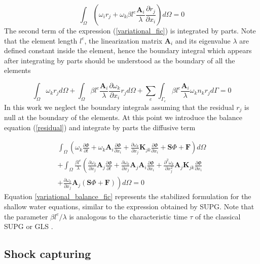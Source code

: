 \documentclass[a4paper,12pt]{article}
\newcommand{\pder}[2]{\frac{\partial#1}{\partial#2}}
\newcommand{\ppder}[2]{\frac{\partial^2#1}{\partial#2^2}}
\begin{document}
\begin{equation} \label{variational_fic}
\int_\Omega \left(
    \omega_i r_j + \omega_k \beta l^e\frac{\mathbf{A}_i}{\lambda}\pder{r_j}{x_i}
\right) d\Omega = 0
\end{equation}
The second term of the expression (\ref{variational_fic}) is integrated by parts. Note that the element length $l^e$, the linearization matrix $\mathbf{A}_i$ and its eigenvalue $\lambda$ are defined constant inside the element, hence the boundary integral which appears after integrating by parts should be understood as the boundary of all the elements

\begin{equation} \label{variational_fic_parts}
\int_\Omega \omega_k r_j d\Omega
+ \int_\Omega \beta l^e\frac{\mathbf{A}_i}{\lambda}\pder{\omega_k}{x_i} r_j d\Omega
+ \sum_e \int_{\Gamma_e} \beta l^e\frac{\mathbf{A}_i}{\lambda}\omega_kn_kr_j d\Gamma = 0
\end{equation}
In this work we neglect the boundary integrals assuming that the residual $r_j$ is null at the boundary of the elements. At this point we introduce the balance equation (\ref{residual}) and integrate by parts the diffusive term

\begin{multline} \label{variational_balance_fic}
\int_\Omega \left(
    \omega_k \pder{\Phi}{t} + \omega_k \mathbf{A}_i\pder{\Phi}{x_i}
    + \pder{\omega_k}{x_j} \mathbf{K}_{jk} \pder{\Phi}{x_i} + \mathbf{S}\Phi + \mathbf{F}
\right) d\Omega\\ +
\int_\Omega \frac{\beta l^e}{\lambda} \left(
    \pder{\omega_k}{x_j} \mathbf{A}_j \pder{\Phi}{t}
    + \pder{\omega_k}{x_j} \mathbf{A}_j\mathbf{A}_i\pder{\Phi}{x_i}
    + \ppder{\omega_k}{x_j} \mathbf{A}_j\mathbf{K}_{jk} \pder{\Phi}{x_i} \right. \\
    \left.
    + \pder{\omega_k}{x_j} \mathbf{A}_j(\mathbf{S}\Phi + \mathbf{F})
\right) d\Omega
=0
\end{multline}
Equation \ref{variational_balance_fic} represents the stabilized formulation for the shallow water equations, similar to the expression obtained by SUPG. Note that the parameter $\beta l^e/\lambda$ is analogous to the characteristic time $\tau$ of the classical SUPG or GLS \cite{cotela2016}.

\subsection{Shock capturing}
\end{document}
